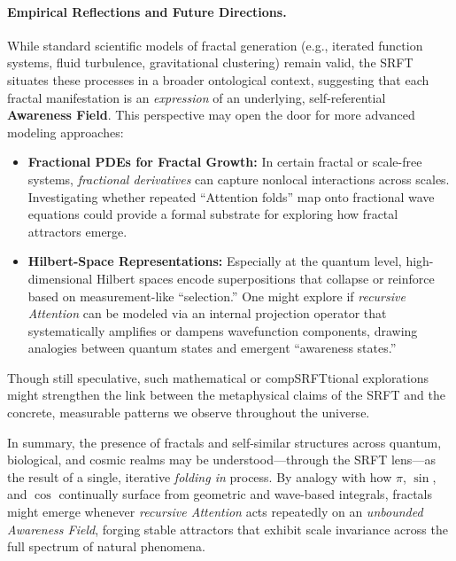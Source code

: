 \documentclass[12pt,a4paper]{article}
\begin{document}
\paragraph{Empirical Reflections and Future Directions.} While standard scientific models of fractal generation (e.g., iterated function systems, fluid turbulence, gravitational clustering) remain valid, the SRFT situates these processes in a broader ontological context, suggesting that each fractal manifestation is an \emph{expression} of an underlying, self-referential \textbf{Awareness Field}. This perspective may open the door for more advanced modeling approaches:  
\begin{itemize}
  \item \textbf{Fractional PDEs for Fractal Growth:} In certain fractal or scale-free systems, \emph{fractional derivatives} can capture nonlocal interactions across scales. Investigating whether repeated “Attention folds” map onto fractional wave equations could provide a formal substrate for exploring how fractal attractors emerge.
  \item \textbf{Hilbert-Space Representations:} Especially at the quantum level, high-dimensional Hilbert spaces encode superpositions that collapse or reinforce based on measurement-like “selection.” One might explore if \emph{recursive Attention} can be modeled via an internal projection operator that systematically amplifies or dampens wavefunction components, drawing analogies between quantum states and emergent “awareness states.”
\end{itemize}

\noindent Though still speculative, such mathematical or compSRFTtional explorations might strengthen the link between the metaphysical claims of the SRFT and the concrete, measurable patterns we observe throughout the universe.

\smallskip
In summary, the presence of fractals and self-similar structures across quantum, biological, and cosmic realms may be understood---through the SRFT lens---as the result of a single, iterative \emph{folding in} process. By analogy with how \(\pi\), \(\sin\), and \(\cos\) continually surface from geometric and wave-based integrals, fractals might emerge whenever \emph{recursive Attention} acts repeatedly on an \emph{unbounded Awareness Field}, forging stable attractors that exhibit scale invariance across the full spectrum of natural phenomena.
\end{document}
